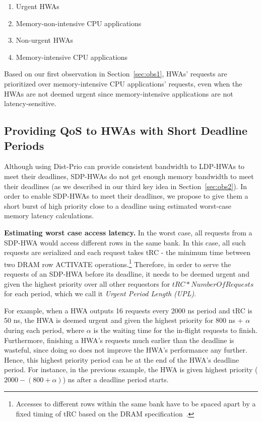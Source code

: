 \documentclass[10pt,letterpaper]{article}
\newcommand{\kevin}[1]{}
\begin{document}
\begin{enumerate}
\item{Urgent HWAs}
\item{Memory-non-intensive CPU applications}
\item{Non-urgent HWAs}
\item{Memory-intensive CPU applications}
\end{enumerate}

Based on our first observation in Section~\ref{sec:obs1},
HWAs' requests are prioritized over memory-intensive CPU
applications' requests, even when the HWAs are not deemed urgent
since memory-intensive applications are not latency-sensitive.

\subsection{Providing QoS to HWAs with Short Deadline Periods}
\label{sec:shortdeadline}

Although using Dist-Prio can provide consistent bandwidth to LDP-HWAs
to meet their deadlines, SDP-HWAs do not get enough memory bandwidth to meet
their deadlines (as we described in our third key idea in
Section~\ref{sec:obs2}). In order to enable SDP-HWAs to meet their deadlines, we
propose to give them a short burst of high priority close to a deadline using
estimated worst-case memory latency calculations.

\kevin{Links back to my previous comment on using Dist-Prio for SDP? Isn't this
scheme essentially changing the emergency condition based on the worst-case mem
latency?}



\noindent\textbf{Estimating worst case access latency.} In the worst case, all
requests from a SDP-HWA would access different rows in the same bank. In this
case, all such requests are serialized and each request takes tRC - the minimum
time between two DRAM row ACTIVATE operations.\footnote{Accesses to different
rows within the same bank have to be spaced apart by a fixed timing of tRC based
on the DRAM specification~\cite{jedec-ddr3}.} Therefore, in order to serve the
requests of an SDP-HWA before its deadline, it needs to be deemed urgent and
given the highest priority over all other requestors for $tRC*NumberOfRequests$
for each period, which we call it \emph{Urgent Period Length (UPL)}.

For example, when a HWA outputs 16 requests every 2000 ns period and tRC is 50
ns, the HWA is deemed urgent and given the highest priority for 800 ns +
$\alpha$ during each period, where $\alpha$ is the waiting time for the
in-flight requests to finish. Furthermore, finishing a HWA's requests much
earlier than the deadline is wasteful, since doing so does not improve the HWA's
performance any further. Hence, this highest priority period can be at the end
of the HWA's deadline period. For instance, in the previous example, the HWA is
given highest priority ($2000-(800+\alpha)$) ns after a deadline period starts.
\end{document}
